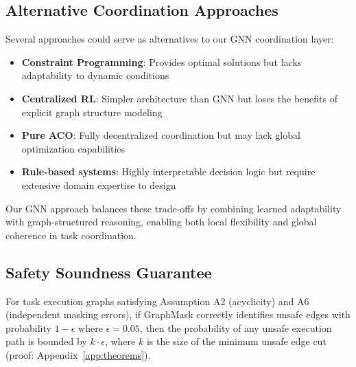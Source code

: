 \documentclass{article}
\begin{document}

\subsection{Alternative Coordination Approaches}

Several approaches could serve as alternatives to our GNN coordination layer:

\begin{itemize}
\item \textbf{Constraint Programming}: Provides optimal solutions but lacks adaptability to dynamic conditions
\item \textbf{Centralized RL}: Simpler architecture than GNN but loses the benefits of explicit graph structure modeling
\item \textbf{Pure ACO}: Fully decentralized coordination but may lack global optimization capabilities
\item \textbf{Rule-based systems}: Highly interpretable decision logic but require extensive domain expertise to design
\end{itemize}

Our GNN approach balances these trade-offs by combining learned adaptability with graph-structured reasoning, enabling both local flexibility and global coherence in task coordination.

\subsection{Safety Soundness Guarantee}

\begin{theorem}
\label{thm:safety_soundness}
For task execution graphs satisfying Assumption A2 (acyclicity) and A6 (independent masking errors), if GraphMask correctly identifies unsafe edges with probability $1-\epsilon$ where $\epsilon = 0.05$, then the probability of any unsafe execution path is bounded by $k \cdot \epsilon$, where $k$ is the size of the minimum unsafe edge cut (proof: Appendix~\ref{app:theorems}).
\end{theorem}
\end{document}
